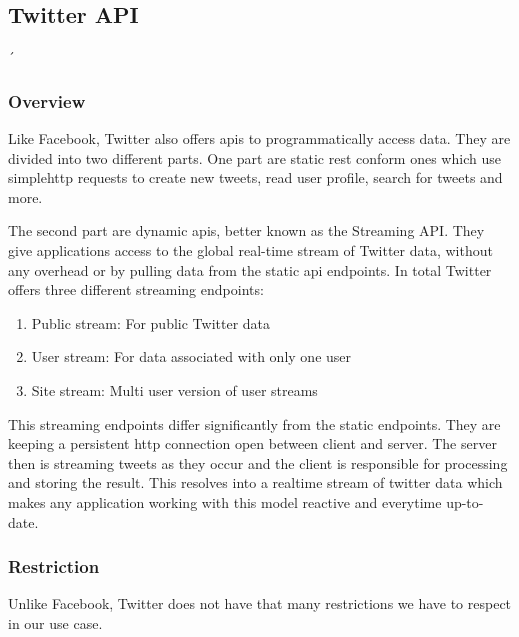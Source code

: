 \documentclass[11pt,titlepage,oneside,openany]{book}
\begin{document}
\subsection{Twitter API}´
\label{subsec:twapi}

\subsubsection{Overview}
\label{subsub:twoverview}


Like Facebook, Twitter also offers \acrshort{api}s to programmatically access data. They are divided into two different parts. One part are static \acrfull{rest} conform ones which use simple\acrshort{http} requests to create new tweets, read user profile, search for tweets and more.
\par
\noindent The second part are dynamic \acrshort{api}s, better known as the Streaming API. They give applications access to the global real-time stream of Twitter data, without any overhead or by pulling data from the static \acrshort{api} endpoints. In total Twitter offers three different streaming endpoints:

\begin{enumerate}
   \item Public stream: For public Twitter data
   \item User stream: For data associated with only one user
   \item Site stream: Multi user version of user streams
\end{enumerate}

This streaming endpoints differ significantly from the static endpoints. They are keeping a persistent \acrshort{http} connection open between client and server. The server then is streaming tweets as they occur and the client is responsible for processing and storing the result. This resolves into a realtime stream of twitter data which makes any application working with this model reactive and everytime up-to-date.\cite{Twitter2012-05-15}

\subsubsection{Restriction}
\label{subsub:twrestrictions}

Unlike Facebook, Twitter does not have that many restrictions we have to respect in our use case.
\end{document}
